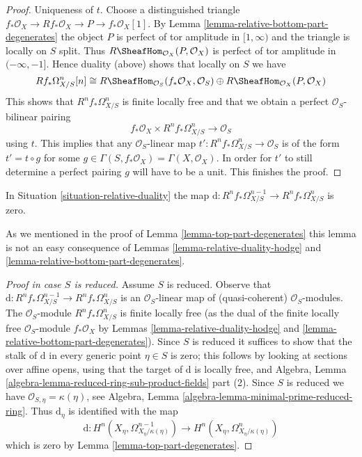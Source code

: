 \begin{proof}
\medskip\noindent
Uniqueness of $t$. Choose a distinguished triangle
$f_*\mathcal{O}_X \to Rf_*\mathcal{O}_X \to P \to f_*\mathcal{O}_X[1]$.
By Lemma \ref{lemma-relative-bottom-part-degenerates}
the object $P$ is perfect of tor amplitude in $[1, \infty)$
and the triangle is locally on $S$ split.
Thus $R\SheafHom_{\mathcal{O}_X}(P, \mathcal{O}_X)$ is perfect
of tor amplitude in $(-\infty, -1]$. Hence duality (above) shows that
locally on $S$ we have
$$
Rf_*\Omega^n_{X/S}[n] \cong
R\SheafHom_{\mathcal{O}_S}(f_*\mathcal{O}_X, \mathcal{O}_S)
\oplus R\SheafHom_{\mathcal{O}_X}(P, \mathcal{O}_X)
$$
This shows that $R^nf_*\Omega^n_{X/S}$ is finite locally free and
that we obtain a perfect $\mathcal{O}_S$-bilinear pairing
$$
f_*\mathcal{O}_X \times R^nf_*\Omega^n_{X/S} \longrightarrow \mathcal{O}_S
$$
using $t$.
This implies that any $\mathcal{O}_S$-linear map
$t' : R^nf_*\Omega^n_{X/S} \to \mathcal{O}_S$ is of the form
$t' = t \circ g$ for some
$g \in \Gamma(S, f_*\mathcal{O}_X) = \Gamma(X, \mathcal{O}_X)$.
In order for $t'$ to still determine a perfect pairing $g$ will have
to be a unit. This finishes the proof.
\end{proof}

\begin{lemma}
\label{lemma-relative-top-part-degenerates}
In Situation \ref{situation-relative-duality} the map
$\text{d} : R^nf_*\Omega^{n - 1}_{X/S} \to R^nf_*\Omega^n_{X/S}$
is zero.
\end{lemma}

\noindent
As we mentioned in the proof of Lemma \ref{lemma-top-part-degenerates}
this lemma is not an easy consequence of Lemmas
\ref{lemma-relative-duality-hodge} and
\ref{lemma-relative-bottom-part-degenerates}.

\begin{proof}[Proof in case $S$ is reduced]
Assume $S$ is reduced. Observe that
$\text{d} : R^nf_*\Omega^{n - 1}_{X/S} \to R^nf_*\Omega^n_{X/S}$
is an $\mathcal{O}_S$-linear map of (quasi-coherent) $\mathcal{O}_S$-modules.
The $\mathcal{O}_S$-module $R^nf_*\Omega^n_{X/S}$ is finite locally free
(as the dual of the finite locally free $\mathcal{O}_S$-module
$f_*\mathcal{O}_X$ by Lemmas
\ref{lemma-relative-duality-hodge} and
\ref{lemma-relative-bottom-part-degenerates}).
Since $S$ is reduced it suffices to show that
the stalk of $\text{d}$ in every generic point $\eta \in S$
is zero; this follows by looking at sections over affine opens,
using that the target of $\text{d}$ is locally free, and
Algebra, Lemma \ref{algebra-lemma-reduced-ring-sub-product-fields} part (2).
Since $S$ is reduced we have $\mathcal{O}_{S, \eta} = \kappa(\eta)$, see
Algebra, Lemma \ref{algebra-lemma-minimal-prime-reduced-ring}.
Thus $\text{d}_\eta$ is identified with the map
$$
\text{d} :
H^n(X_\eta, \Omega^{n - 1}_{X_\eta/\kappa(\eta)})
\longrightarrow
H^n(X_\eta, \Omega^n_{X_\eta/\kappa(\eta)})
$$
which is zero by Lemma \ref{lemma-top-part-degenerates}.
\end{proof}

